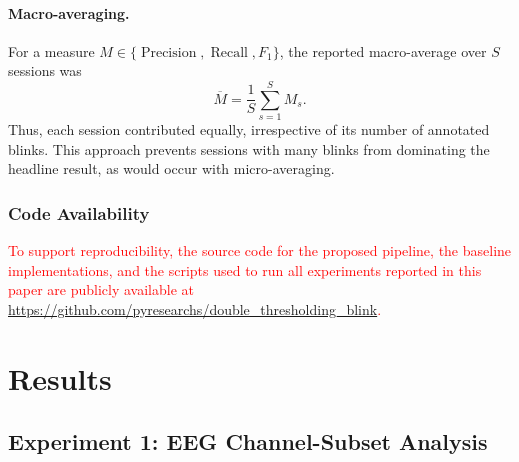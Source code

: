 \documentclass[journal,twoside,web]{ieeecolor}
\newcommand{\rev}[1]{\textcolor{red}{#1}}
\begin{document}
\paragraph{Macro-averaging.}
For a measure $M\in\{\operatorname{Precision},\operatorname{Recall},F_1\}$,
the reported macro-average over $S$ sessions was
\begin{equation}
    \overline{M}=\frac{1}{S}\sum_{s=1}^{S}M_s.
\end{equation}
Thus, each session contributed equally, irrespective of its number of annotated  blinks. This approach prevents sessions with many blinks from dominating the headline result, as would occur with micro-averaging.
 
\subsubsection{Code Availability}
\label{sec:code_availability}
%
\rev{To support reproducibility, the source code for the proposed pipeline, the baseline implementations, and the scripts used to run all experiments reported in this paper are publicly available at \url{https://github.com/pyresearchs/double_thresholding_blink}.}
 
%
%
%





\section{Results}
\label{sec:results}



%
%
%
\subsection{Experiment 1: EEG Channel-Subset Analysis}
\label{sec:exp1_channel}
%



%
%
%
%
%
%
%
%
%
%
%
\end{document}
